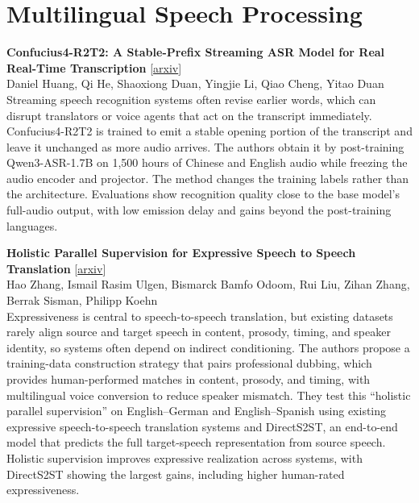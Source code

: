 \documentclass[12pt,letterpaper]{article}
\begin{document}
\medskip


\section*{Multilingual Speech Processing}

\begin{minipage}{\linewidth}
{\small\textbf{Confucius4-R2T2: A Stable-Prefix Streaming ASR Model for Real Real-Time Transcription}} {\scriptsize[\href{https://arxiv.org/abs/2611.06043}{arxiv}]}\\
{\scriptsize Daniel Huang, Qi He, Shaoxiong Duan, Yingjie Li, Qiao Cheng, Yitao Duan}\\


{\footnotesize Streaming speech recognition systems often revise earlier words, which can disrupt translators or voice agents that act on the transcript immediately. Confucius4-R2T2 is trained to emit a stable opening portion of the transcript and leave it unchanged as more audio arrives. The authors obtain it by post-training Qwen3-ASR-1.7B on 1,500 hours of Chinese and English audio while freezing the audio encoder and projector. The method changes the training labels rather than the architecture. Evaluations show recognition quality close to the base model's full-audio output, with low emission delay and gains beyond the post-training languages.}

\end{minipage}

\medskip

\begin{minipage}{\linewidth}
{\small\textbf{Holistic Parallel Supervision for Expressive Speech to Speech Translation}} {\scriptsize[\href{https://arxiv.org/abs/2611.06010}{arxiv}]}\\
{\scriptsize Hao Zhang, Ismail Rasim Ulgen, Bismarck Bamfo Odoom, Rui Liu, Zihan Zhang, Berrak Sisman, Philipp Koehn}\\


{\footnotesize Expressiveness is central to speech-to-speech translation, but existing datasets rarely align source and target speech in content, prosody, timing, and speaker identity, so systems often depend on indirect conditioning. The authors propose a training-data construction strategy that pairs professional dubbing, which provides human-performed matches in content, prosody, and timing, with multilingual voice conversion to reduce speaker mismatch. They test this ``holistic parallel supervision'' on English--German and English--Spanish using existing expressive speech-to-speech translation systems and DirectS2ST, an end-to-end model that predicts the full target-speech representation from source speech. Holistic supervision improves expressive realization across systems, with DirectS2ST showing the largest gains, including higher human-rated expressiveness.}

\end{minipage}
\end{document}
